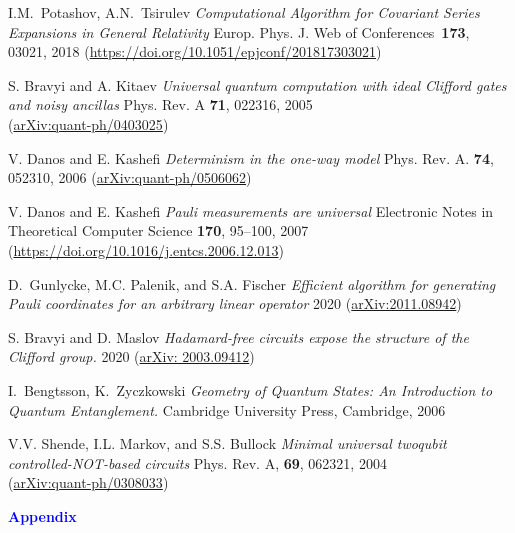 \documentclass[12pt,a4paper,twoside]{article}      %
\begin{document}
\begin{thebibliography}{999}
I.M.~Potashov, A.N.~Tsirulev \textit{Computational Algorithm for Covariant Series Expansions in General Relativity}  Europ. Phys. J. Web of Conferences~\textbf{173}, 03021, 2018
(\url{https://doi.org/10.1051/epjconf/201817303021})

S. Bravyi and A. Kitaev \textit{Universal quantum computation with ideal Clifford gates  and noisy ancillas} Phys. Rev. A \textbf{71}, 022316, 2005\\ (\href{https://arxiv.org/abs/quant-ph/0403025} {arXiv:quant-ph/0403025})

V. Danos and E. Kashefi \textit{Determinism in the one-way model} Phys. Rev. A. \textbf{74}, 052310, 2006 (\href{https://arxiv.org/abs/quant-ph/0506062} {arXiv:quant-ph/0506062})

V. Danos and E. Kashefi \textit{Pauli measurements are universal} Electronic Notes in Theoretical Computer Science \textbf{170}, 95--100, 2007\\
(\url{https://doi.org/10.1016/j.entcs.2006.12.013})

D.~Gunlycke, M.C. Palenik, and S.A. Fischer
\textit{Efficient algorithm for generating Pauli coordinates for an arbitrary linear operator} 2020
(\href{http://arxiv.org/abs/2011.08942}{arXiv:2011.08942})

S. Bravyi and D. Maslov \textit{Hadamard-free circuits expose the structure of the Clifford group.} 2020 (\href{https://arxiv.org/abs/2003.09412} {arXiv: 2003.09412})

I.~Bengtsson, K.~Zyczkowski
\textit{Geometry of Quantum States: An Introduction to Quantum Entanglement.} Cambridge University Press, Cambridge, 2006

V.V. Shende, I.L. Markov, and S.S. Bullock \textit{Minimal universal twoqubit controlled-NOT-based circuits} Phys. Rev. A, \textbf{69}, 062321, 2004\\
(\href{https://arxiv.org/abs/quant-ph/0308033} {arXiv:quant-ph/0308033})

\end{thebibliography}



\vspace{3ex}

\noindent
{\Large\bf{\textcolor{blue}{Appendix}}}


\vspace{2ex}
\end{document}
